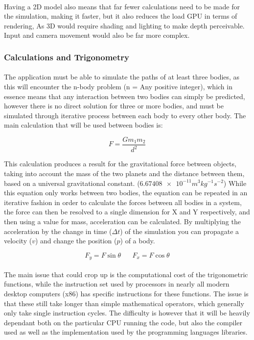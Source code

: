 \paragraph{}
Having a 2D model also means that far fewer calculations need to be made for the simulation, making it faster, but it also reduces the load GPU in terms of rendering, As 3D would require shading and lighting to make depth perceivable. Input and camera movement would also be far more complex.

\subsubsection{Calculations and Trigonometry}
\paragraph{}
The application must be able to simulate the paths of at least three bodies, as this will encounter the n-body problem (n = Any positive integer), which in essence means that any interaction between two bodies can simply be predicted, however there is no direct solution for three or more bodies, and must be simulated through iterative process between each body to every other body.
The main calculation that will be used between bodies is:

$$F=\frac{Gm_1m_2}{d^2}$$

This calculation produces a result for the gravitational force between objects, taking into account the mass of the two planets and the distance between them, based on a universal gravitational constant. ($\num{6.67408e-11} m^{3} kg^{-1} s^{-2}$) 
While this equation only works between two bodies, the equation can be repeated in an iterative fashion in order to calculate the forces between all bodies in a system, the force can then be resolved to a single dimension for X and Y respectively, and then using a value for mass, acceleration can be calculated. By multiplying the acceleration by the change in time ($\Delta t$) of the simulation you can propagate a velocity ($v$) and change the position ($p$) of a body.

$$F_y=F\sin{\theta} \hspace{20pt} F_x=F\cos{\theta}$$

\paragraph{}
The main issue that could crop up is the computational cost of the trigonometric functions, while the instruction set used by processors in nearly all modern desktop computers (x86) has specific instructions for these functions.
The issue is that these still take longer than simple mathematical operators, which generally only take single instruction cycles. The difficulty is however that it will be heavily dependant both on the particular CPU running the code, but also the compiler used as well as the implementation used by the programming languages libraries.

